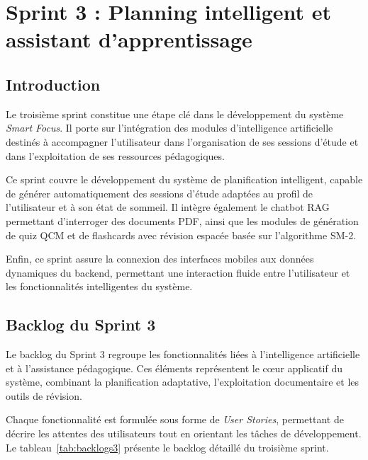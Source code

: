 
\chapter{Sprint 3 : Planning intelligent et assistant d'apprentissage}
\label{chap:sprint3}

\section{Introduction}

Le troisième sprint constitue une étape clé dans le développement du système \textit{Smart Focus}. Il porte sur l'intégration des modules d'intelligence artificielle destinés à accompagner l'utilisateur dans l'organisation de ses sessions d'étude et dans l'exploitation de ses ressources pédagogiques.

Ce sprint couvre le développement du système de planification intelligent, capable de générer automatiquement des sessions d'étude adaptées au profil de l'utilisateur et à son état de sommeil. Il intègre également le chatbot RAG permettant d'interroger des documents PDF, ainsi que les modules de génération de quiz QCM et de flashcards avec révision espacée basée sur l'algorithme SM-2.

Enfin, ce sprint assure la connexion des interfaces mobiles aux données dynamiques du backend, permettant une interaction fluide entre l'utilisateur et les fonctionnalités intelligentes du système.

\section{Backlog du Sprint 3}

Le backlog du Sprint 3 regroupe les fonctionnalités liées à l'intelligence artificielle et à l'assistance pédagogique. Ces éléments représentent le cœur applicatif du système, combinant la planification adaptative, l'exploitation documentaire et les outils de révision.

Chaque fonctionnalité est formulée sous forme de \textit{User Stories}, permettant de décrire les attentes des utilisateurs tout en orientant les tâches de développement. Le tableau~\ref{tab:backlogs3} présente le backlog détaillé du troisième sprint.

